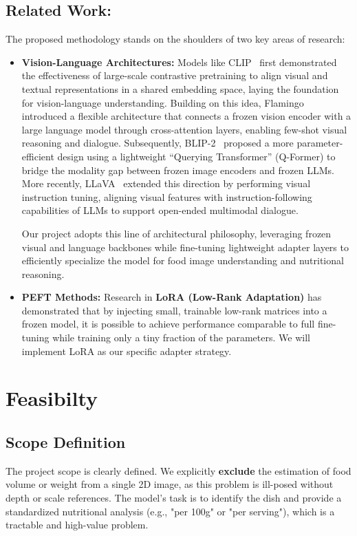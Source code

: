 \documentclass{article}
\begin{document}
\subsection{Related Work: } 
The proposed methodology stands on the shoulders of two key areas of research:
\begin{itemize}
    \item \textbf{Vision-Language Architectures:} Models like CLIP~\cite{radford2021clip} first demonstrated the effectiveness of large-scale contrastive pretraining to align visual and textual representations in a shared embedding space, laying the foundation for vision-language understanding. Building on this idea, Flamingo~\cite{alayrac2022flamingo} introduced a flexible architecture that connects a frozen vision encoder with a large language model through cross-attention layers, enabling few-shot visual reasoning and dialogue. Subsequently, BLIP-2~\cite{li2023blip2} proposed a more parameter-efficient design using a lightweight ``Querying Transformer'' (Q-Former) to bridge the modality gap between frozen image encoders and frozen LLMs. More recently, LLaVA~\cite{liu2023llava} extended this direction by performing visual instruction tuning, aligning visual features with instruction-following capabilities of LLMs to support open-ended multimodal dialogue. 

    Our project adopts this line of architectural philosophy, leveraging frozen visual and language backbones while fine-tuning lightweight adapter layers to efficiently specialize the model for food image understanding and nutritional reasoning.

    \item \textbf{PEFT Methods:} Research in \textbf{LoRA (Low-Rank Adaptation)}\cite{2021lora} has demonstrated that by injecting small, trainable low-rank matrices into a frozen model, it is possible to achieve performance comparable to full fine-tuning while training only a tiny fraction of the parameters. We will implement LoRA as our specific adapter strategy.
\end{itemize}

\section{Feasibilty}
\subsection{Scope Definition}
The project scope is clearly defined. We explicitly \textbf{exclude} the estimation of food volume or weight from a single 2D image, as this problem is ill-posed without depth or scale references. The model's task is to identify the dish and provide a standardized nutritional analysis (e.g., "per 100g" or "per serving"), which is a tractable and high-value problem.
\end{document}
